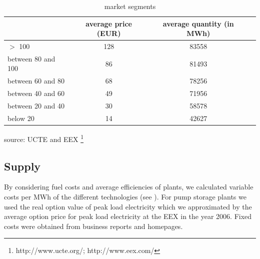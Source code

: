 \begin{table}
\begin{tabular}{llll}
 & \multicolumn{1}{c}{average price (EUR)} & \multicolumn{1}{c}{average quantity (in MWh)} &  \\ 
 \hline
$>$ 100 & \multicolumn{1}{c}{128} & \multicolumn{1}{c}{83558} &  \\ 
between 80 and 100 & \multicolumn{1}{c}{86} & \multicolumn{1}{c}{81493} &  \\ 
between 60 and 80 & \multicolumn{1}{c}{68} & \multicolumn{1}{c}{78256} &  \\ 
between 40 and 60 & \multicolumn{1}{c}{49} & \multicolumn{1}{c}{71956} &  \\ 
between 20 and 40 & \multicolumn{1}{c}{30} & \multicolumn{1}{c}{58578} &  \\ 
below 20 & \multicolumn{1}{c}{14} & \multicolumn{1}{c}{42627} &  \\ 
\hline
\end{tabular}
\label{tab:demand}
\caption{market segments}
\begin{center}
source: UCTE and EEX \footnote{http://www.ucte.org/; http://www.eex.com/}
\end{center}    
\end{table}



\subsection{Supply}

By considering fuel costs and average efficiencies of plants, we calculated variable costs per MWh of the different technologies (see \cite{Leprich2004}). For pump storage plants we used the real option value of peak load electricity which we approximated by the average option price for peak load electricity at the EEX in the year 2006. Fixed costs were obtained from business reports and homepages.

